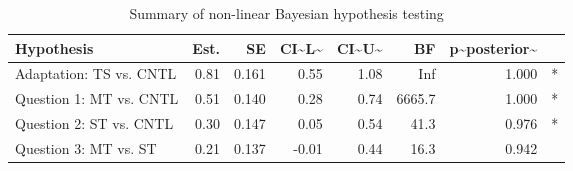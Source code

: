 \begin{table}

\caption{\label{tab:plots for Exp 1a}Summary of non-linear Bayesian hypothesis testing}
\centering
\begin{tabular}[t]{l|r|r|r|r|r|r|l}
\hline
Hypothesis & Est. & SE & CI\textasciitilde{}L\textasciitilde{} & CI\textasciitilde{}U\textasciitilde{} & BF & p\textasciitilde{}posterior\textasciitilde{} & \\
\hline
Adaptation: TS vs. CNTL & 0.81 & 0.161 & 0.55 & 1.08 & Inf & 1.000 & *\\
\hline
Question 1: MT vs. CNTL & 0.51 & 0.140 & 0.28 & 0.74 & 6665.7 & 1.000 & *\\
\hline
Question 2: ST vs. CNTL & 0.30 & 0.147 & 0.05 & 0.54 & 41.3 & 0.976 & *\\
\hline
Question 3: MT vs. ST & 0.21 & 0.137 & -0.01 & 0.44 & 16.3 & 0.942 & \\
\hline
\end{tabular}
\end{table}
